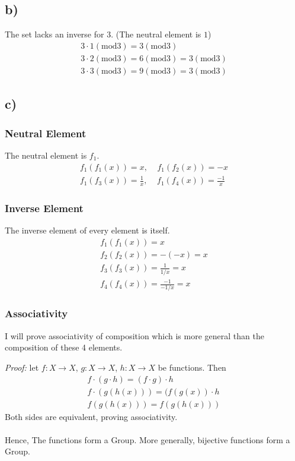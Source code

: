 \documentclass[]{scrartcl}
\begin{document}
\subsection{b)}
The set lacks an inverse for $3$. (The neutral element is $1$)
\begin{gather}
	3\cdot 1(\text{mod}3) = 3 (\text{mod}3)\\
	3\cdot 2(\text{mod}3) = 6(\text{mod}3) = 3(\text{mod}3)\\
	3\cdot3(\text{mod}3) = 9(\text{mod}3) = 3(\text{mod}3)
\end{gather}

\subsection{c)}

\subsubsection{Neutral Element}
The neutral element is $f_1$.
\begin{gather}
	f_1(f_1(x)) = x,\;\;\;\; f_1(f_2(x)) = -x\\
	f_1(f_3(x)) = \frac{1}{x}, \;\;\;\; f_1(f_4(x)) = \frac{-1}{x}
\end{gather}

\subsubsection{Inverse Element}
The inverse element of every element is itself.
\begin{gather}
	f_1(f_1(x)) = x\\
	f_2(f_2(x)) = -(-x) = x\\
	f_3(f_3(x)) = \frac{1}{1/x} = x\\
	f_4(f_4(x)) = \frac{-1}{-1/x} = x
\end{gather}

\subsubsection{Associativity}
I will prove associativity of composition which is more general than the composition of these 4 elements.

\textit{Proof: } let $f:X\rightarrow X$, $g:X\rightarrow X$, $h:X\rightarrow X$ be functions. Then
\begin{gather}
	f\cdot(g\cdot h) = (f\cdot g)\cdot h\\
	f\cdot(g(h(x))) = (f(g(x))\cdot h\\
	f(g(h(x))) = f(g(h(x)))
\end{gather}
Both sides are equivalent, proving associativity.\\\\
Hence, The functions form a Group. More generally, bijective functions form a Group.
\end{document}
